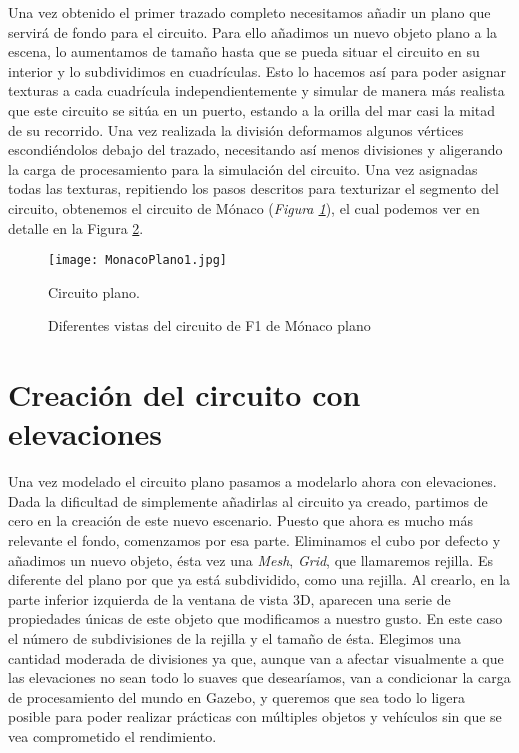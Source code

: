 Una vez obtenido el primer trazado completo necesitamos añadir un plano que servirá de fondo para el circuito. Para ello añadimos un nuevo objeto plano a la escena, lo aumentamos de tamaño hasta que se pueda situar el circuito en su interior y lo subdividimos en cuadrículas. Esto lo hacemos así para poder asignar texturas a cada cuadrícula independientemente y simular de manera más realista que este circuito se sitúa en un puerto, estando a la orilla del mar casi la mitad de su recorrido. Una vez realizada la división deformamos algunos vértices escondiéndolos debajo del trazado, necesitando así menos divisiones y aligerando la carga de procesamiento para la simulación del circuito. Una vez asignadas todas las texturas, repitiendo los pasos descritos para texturizar el segmento del circuito, obtenemos el circuito de Mónaco (\textit{Figura \ref{fig:monacoplano1}}), el cual podemos ver en detalle en la Figura \ref{fig:monacoplanovistas}.

\begin{figure}[t]
	\centering
	\texttt{[image: MonacoPlano1.jpg]}
	\caption{Circuito plano.} \label{fig:monacoplano1}
\end{figure}

\begin{figure}
	\centering
	\hspace{0.02\textwidth}	
	\vspace{0.01\textwidth}
	\hspace{0.02\textwidth}
	\caption{Diferentes vistas del circuito de F1 de Mónaco plano} \label{fig:monacoplanovistas}
\end{figure}


\section{Creación del circuito con elevaciones}
\label{sec:circarr_circuitoconelevaciones}

Una vez modelado el circuito plano pasamos a modelarlo ahora con elevaciones. Dada la dificultad de simplemente añadirlas al circuito ya creado, partimos de cero en la creación de este nuevo escenario. Puesto que ahora es mucho más relevante el fondo, comenzamos por esa parte. Eliminamos el cubo por defecto y añadimos un nuevo objeto, ésta vez una \textit{Mesh}, \textit{Grid}, que llamaremos rejilla. Es diferente del plano por que ya está subdividido, como una rejilla. Al crearlo, en la parte inferior izquierda de la ventana de vista 3D, aparecen una serie de propiedades únicas de este objeto que modificamos a nuestro gusto. En este caso el número de subdivisiones de la rejilla y el tamaño de ésta. Elegimos una cantidad moderada de divisiones ya que, aunque van a afectar visualmente a que las elevaciones no sean todo lo suaves que desearíamos, van a condicionar la carga de procesamiento del mundo en Gazebo, y queremos que sea todo lo ligera posible para poder realizar prácticas con múltiples objetos y vehículos sin que se vea comprometido el rendimiento.

